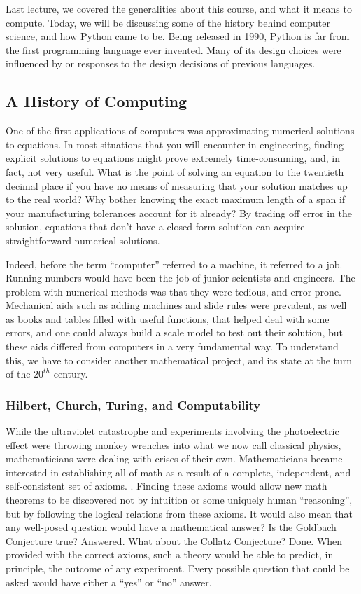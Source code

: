 Last lecture, we covered the generalities about this course, and what it
means to compute. Today, we will be discussing some of the history behind 
computer science, and how Python came to be. Being released in 1990, Python
is far from the first programming language ever invented. Many of its design
choices were influenced by or responses to the design decisions of previous
languages. 

\subsection{A History of Computing}
One of the first applications of computers was approximating numerical
solutions to equations. In most situations that you will encounter in 
engineering, finding explicit solutions to equations might prove extremely 
time-consuming, and, in fact, not very useful. What is the point of solving an
equation to the twentieth decimal place if you have no means of measuring that
your solution matches up to the real world? Why bother knowing the exact
maximum length of a span if your manufacturing tolerances account for it
already? By trading off error in the solution, equations that don't have a
closed-form solution can acquire straightforward numerical solutions.

Indeed, before the term ``computer'' referred to a machine, it referred to a
job. Running numbers would have been the job of junior scientists and
engineers. The problem with numerical methods was that they were tedious, and
error-prone. Mechanical aids such as adding machines and slide rules were 
prevalent, as well as books and tables filled with useful functions, that
helped deal with some errors, and one could always build a scale model to test
out their solution, but these aids differed from computers in a very
fundamental way. To understand this, we have to consider another mathematical
project, and its state at the turn of the $20^{th}$ century.

\subsubsection{Hilbert, Church, Turing, and Computability}

While the ultraviolet catastrophe and experiments involving the photoelectric
effect were throwing monkey wrenches into what we now call classical physics,
mathematicians were dealing with crises of their own. Mathematicians became
interested in establishing all of math as a result of a complete, independent,
and self-consistent set of axioms. \cite{zach_hilberts_2007}. Finding these
axioms would allow new math theorems to be discovered not by intuition or some
uniquely human ``reasoning'', but by following the logical relations from
these axioms. It would also mean that any well-posed question would have a
mathematical answer? Is the Goldbach Conjecture true? Answered. What about the
Collatz Conjecture? Done. When provided with the correct axioms, such a theory
would be able to predict, in principle, the outcome of any experiment. Every
possible question that could be asked would have either a ``yes'' or ``no''
answer.

